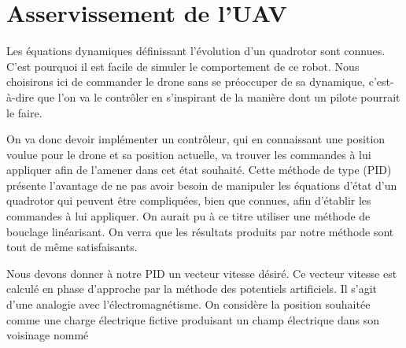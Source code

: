 \section{Asservissement de l'UAV}

Les équations dynamiques définissant l’évolution d’un quadrotor sont connues. C’est pourquoi il est facile de simuler le comportement de ce robot. 
Nous choisirons ici de commander le drone sans se préoccuper de sa dynamique, 
c'est-à-dire que l’on va le contrôler en s’inspirant de la manière dont un pilote pourrait le faire.


On va donc devoir implémenter un contrôleur, qui en connaissant une position voulue pour le drone et sa position actuelle, 
va trouver les commandes à lui appliquer afin de l'amener dans cet état souhaité. Cette méthode de type (PID) présente 
l’avantage de ne pas avoir besoin de manipuler les équations d’état d’un quadrotor qui peuvent être compliquées, 
bien que connues, afin d’établir les commandes à lui appliquer. On aurait pu à ce titre utiliser une méthode de bouclage linéarisant. 
On verra que les résultats produits par notre méthode sont tout de même satisfaisants.



Nous devons donner à notre PID un vecteur vitesse désiré. 
Ce vecteur vitesse est calculé en phase d’approche par la méthode des potentiels artificiels. 
Il s’agit d’une analogie avec l’électromagnétisme. On considère la position souhaitée comme une charge électrique fictive 
produisant un champ électrique dans son voisinage nommé 

